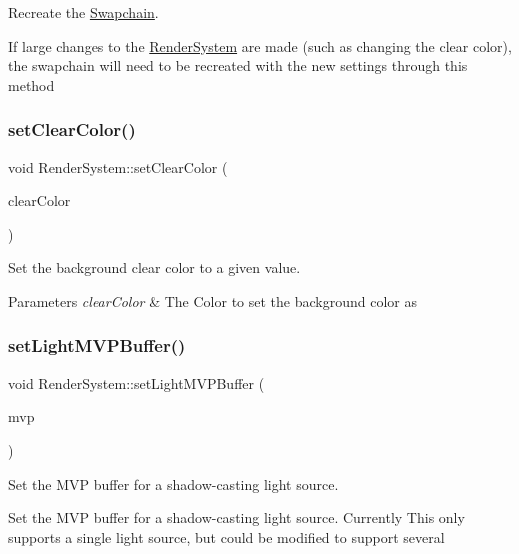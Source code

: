 Recreate the \mbox{\hyperlink{class_swapchain}{Swapchain}}. 

If large changes to the \mbox{\hyperlink{class_render_system}{Render\+System}} are made (such as changing the clear color), the swapchain will need to be recreated with the new settings through this method \mbox{\label{class_render_system_a3d3fc11d70c1b8da1178cd6f5f647c74}} 
\subsubsection{\texorpdfstring{setClearColor()}{setClearColor()}}
{\footnotesize\ttfamily void Render\+System\+::set\+Clear\+Color (\begin{DoxyParamCaption}\item[{Vk\+Clear\+Value}]{clear\+Color }\end{DoxyParamCaption})}



Set the background clear color to a given value. 


\begin{DoxyParams}{Parameters}
{\em clear\+Color} & The Color to set the background color as \\
\hline
\end{DoxyParams}
\mbox{\label{class_render_system_aad31d7e4c0a7b37fd101f3b5c13dbe12}} 
\subsubsection{\texorpdfstring{setLightMVPBuffer()}{setLightMVPBuffer()}}
{\footnotesize\ttfamily void Render\+System\+::set\+Light\+M\+V\+P\+Buffer (\begin{DoxyParamCaption}\item[{const glm\+::mat4 \&}]{mvp }\end{DoxyParamCaption})}



Set the M\+VP buffer for a shadow-\/casting light source. 

Set the M\+VP buffer for a shadow-\/casting light source. Currently This only supports a single light source, but could be modified to support several


